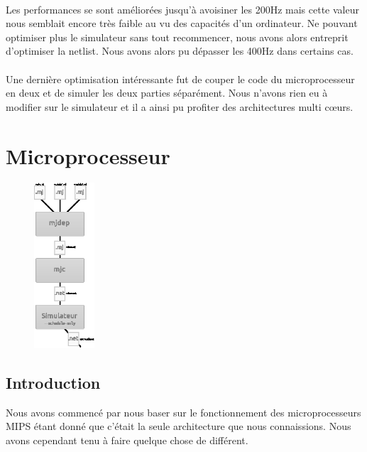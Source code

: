\documentclass{article}
\begin{document}
\paragraph{}Les performances se sont améliorées jusqu'à avoisiner les 200Hz mais cette valeur nous semblait encore très faible au vu des capacités d'un ordinateur. Ne pouvant optimiser plus le simulateur sans tout recommencer, nous avons alors entreprit d'optimiser la netlist. Nous avons alors pu dépasser les 400Hz dans certains cas.

\paragraph{}Une dernière optimisation intéressante fut de couper le code du microprocesseur en deux et de simuler les deux parties séparément. Nous n'avons rien eu à modifier sur le simulateur et il a ainsi pu profiter des architectures multi cœurs.


\section{Microprocesseur}

\begin{figure}
\begin{center}
\includegraphics[width=0.2\textwidth]{zoom_micro.eps}
\end{center}
\end{figure}

\subsection{Introduction}

Nous avons commencé par nous baser sur le fonctionnement des microprocesseurs
MIPS étant donné que c'était la seule architecture que nous connaissions.
Nous avons cependant tenu à faire quelque chose de différent.
\end{document}
